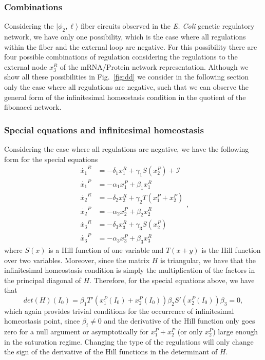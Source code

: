 \subsubsection{Combinations}

Considering the $| \phi_2, \ell \rangle$ fiber circuits observed in 
the \textit{E. Coli} genetic regulatory network, we have only 
one possibility, which is the case where all regulations within 
the fiber and the external loop are negative. For this possibility 
there are four possible combinations of regulation considering 
the regulations to the external node $x_3^R$ of the mRNA/Protein 
network representation. Although we show all these possibilities 
in Fig.~\ref{fig:dd} we consider in the following section only 
the case where all regulations are negative, such that we can 
observe the general form of the infinitesimal homeostasis condition 
in the quotient of the fibonacci network.

\subsubsection{Special equations and infinitesimal homeostasis}

Considering the case where all regulations are negative, we have 
the following form for the special equations
\begin{equation}
    \begin{aligned}
        \dot{x_1}^R &= -\delta_1 x_1^R + \gamma_1 S(x_2^P) + \mathcal{I}\\
        \dot{x_1}^P &= -\alpha_1 x_1^P + \beta_1 x_1^R\\
        \dot{x_2}^R &= -\delta_2 x_2^R + \gamma_2 T(x_1^P + x_2^P)\\
        \dot{x_2}^P &= -\alpha_2 x_2^P + \beta_2 x_2^R\\
        \dot{x_3}^R &= -\delta_3 x_3^R + \gamma_3 S(x_2^P)\\
        \dot{x_3}^P &= -\alpha_3 x_3^P + \beta_3 x_3^R
    \end{aligned},
\end{equation}
where $S(x)$ is a Hill function of one variable and $T(x+y)$ is the Hill 
function over two variables.  Moreover, since the matrix $H$ is triangular, we have that 
the infinitesimal homeostasis condition is simply the multiplication
of the factors in the principal diagonal of $H$. Therefore, 
for the special equations above, we have that 
\begin{equation}
    det(H)(I_0) = \beta_1 T'(x_1^P(I_0) + x_2^P(I_0))\beta_2 S'(x_2^P(I_0)) \beta_3 
    = 0,
\end{equation}
which again provides trivial conditions for the occurrence of
infinitesimal homeostasis point, since $\beta_i \neq 0$ and the derivative
of the Hill function only goes zero for a null argument or 
asymptotically for $x_1^P + x_2^P$ (or only $x_2^P$) large enough
in the saturation regime. Changing the type of the regulations will 
only change the sign of the derivative of the Hill functions in 
the determinant of $H$. 